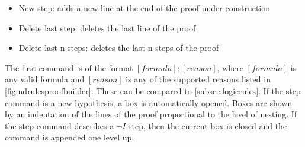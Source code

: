 \documentclass[11pt,twoside,a4paper]{report}
\begin{document}
\begin{itemize}
\item
New step: adds a new line at the end of the proof under construction
\item
Delete last step: deletes the last line of the proof
\item
Delete last n steps: deletes the last n steps of the proof
\end{itemize}

The first command is of the format $[formula]; [reason]$, where $[formula]$ is any valid formula and $[reason]$ is any of the supported reasons listed in \autoref{fig:ndrulesproofbuilder}. These can be compared to \autoref{subsec:logicrules}. If the step command is a new hypothesis, a box is automatically opened. Boxes are shown by an indentation of the lines of the proof proportional to the level of nesting. If the step command describes a $\neg I$ step, then the current box is closed and the command is appended one level up.
\end{document}

